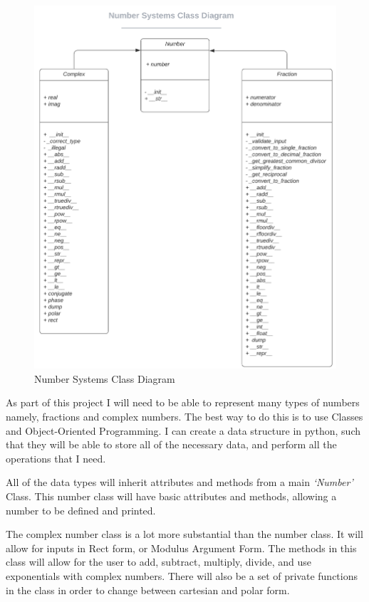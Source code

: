 \documentclass{article}
\begin{document}
\begin{figure}[h]
    \centering
    \captionsetup{justification=centering}
    \includegraphics[scale=0.6]{number-systems-class-diagram}
    \caption{Number Systems Class Diagram}
\end{figure}
As part of this project I will need to be able to represent many types of numbers namely, fractions and complex numbers. The best way to do this is to use Classes and Object-Oriented Programming. I can create a data structure in python, such that they will be able to store all of the necessary data, and perform all the operations that I need.

All of the data types will inherit attributes and methods from a main \textit{‘Number’} Class. This number class will have basic attributes and methods, allowing a number to be defined and printed.

The complex number class is a lot more substantial than the number class.  It will allow for inputs in Rect form, or Modulus Argument Form. The methods in this class will allow for the user to add, subtract, multiply, divide, and use exponentials with complex numbers. There will also be a set of private functions in the class in order to change between cartesian and polar form.
\end{document}
